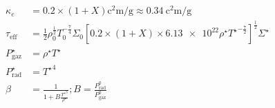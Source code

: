 \begin{align}
    \kappa_e &= 0.2 \times (1 + X) \si{\square\centi\meter\per\gram} \approx \SI{0.34}{\square\centi\meter\per\gram} \\
    \tau_\mathrm{eff} &= \frac{1}{2} \rho_0^\frac{1}{2} T_0^{-\frac{7}{4}} \Sigma_0 \left[ 0.2 \times (1 + X) \times \num{6.13e22} \rho^\star {T^\star}^{-\frac{7}{2}} \right]^\frac{1}{2} \Sigma^\star \\
    P_\mathrm{gaz}^\star &= \rho^\star T^\star \\
    P_\mathrm{rad}^\star &= {T^\star}^4 \\
    \beta &= \frac{1}{1 + B \frac{{T^\star}^3}{\rho^\star}} ; B = \frac{P_\mathrm{rad}^0}{P_\mathrm{gaz}^0} \\
\end{align}
